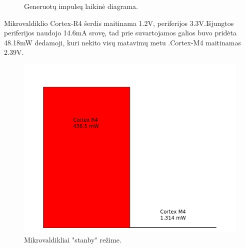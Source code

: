 \documentclass[a4paper, 12pt]{article} %
\begin{document}
\begin{onehalfspacing}
\begin{figure}[H]
\captionsetup{labelformat=numbfirst} %
\captionsetup{labelseparator=tarpas}
\caption{Generuot\k{u} impuls\k{u} laikin\.e diagrama.}
\label{vienas}
\end{figure}
Mikrovaldiklio Cortex-R4 \v{s}erdis maitinama 1.2V, periferijos 3.3V.I\v{s}jungtos periferijos naudojo 14.6mA srov\k{e}, tad prie suvartojamos galios buvo prid\.eta 48.18mW dedamoji, kuri nekito vis\k{u} matavim\k{u} metu .Cortex-M4 maitinamas 2.39V. 
\begin{figure}[H] %
\centering %
\includegraphics[scale=0.4]{pav/modes.jpg} %
\captionsetup{labelformat=numbfirst} %
\captionsetup{labelseparator=tarpas}
\caption{Mikrovaldikliai "stanby" re\v{z}ime.}
\label{vienas}
\end{figure}
\begin{figure}[H] %
\centering %

\end{figure}
\end{onehalfspacing}
\end{document}
